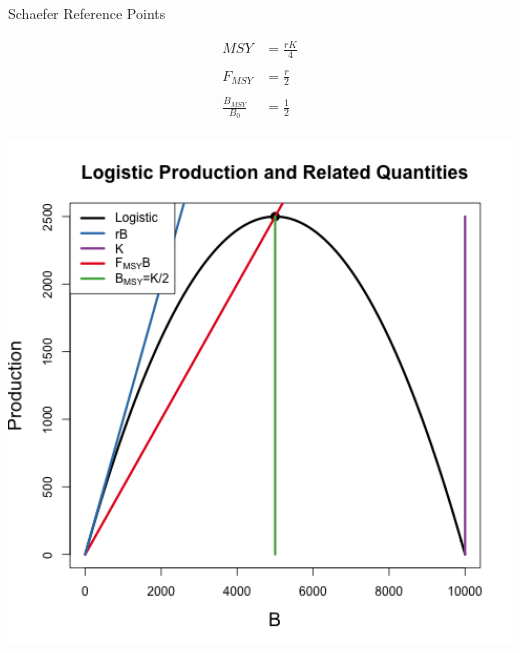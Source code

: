 \documentclass[ xcolor = pdftex, dvipsnames, table ]{beamer}
\begin{document}
\begin{frame}{Schaefer Reference Points}
{\begin{minipage}[h!]{0.44\textwidth}
\begin{align*}
	MSY &= \frac{rK}{4}\\
	~\\       
	F_{MSY} &= \frac{r}{2}\\
	~\\
        \frac{B_{MSY}}{B_0}&= \frac{1}{2}\\
\end{align*}
\end{minipage}
\begin{minipage}[h!]{0.54\textwidth}
\includegraphics[width=1\textwidth]{../plots/srrSchaefferRPplus.png}
\end{minipage}
}
\end{frame}
\end{document}
